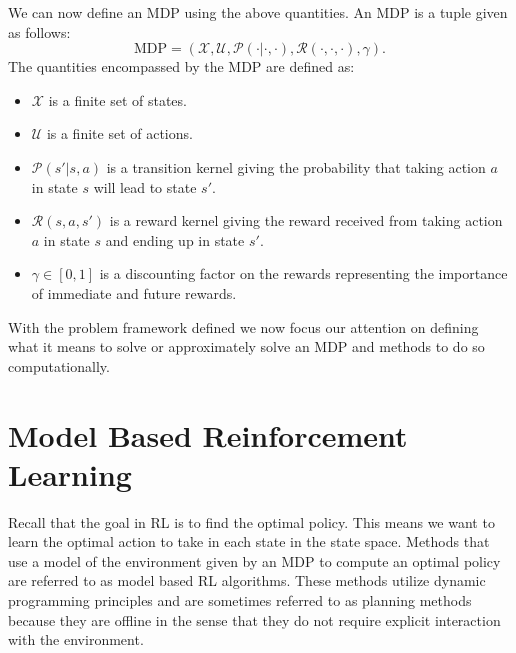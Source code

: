 \documentclass{article}
\newcommand{\mc}{\mathcal}
\begin{document}
We can now define an MDP using the above quantities. An MDP is a tuple given as follows:
\begin{equation}
\text{MDP} = (\mc{X}, \mc{U}, \mc{P}(\cdot|\cdot, \cdot), \mc{R}(\cdot, \cdot, \cdot), \gamma).
\end{equation}
The quantities encompassed by the MDP are defined as:
\begin{itemize}
\item $\mc{X}$ is a finite set of states.
\item $\mc{U}$ is a finite set of actions.
\item $\mc{P}(s'|s, a)$ is a transition kernel giving the probability that taking action $a$ in state $s$ will lead to state $s'$.
\item $\mc{R}(s, a, s')$ is a reward kernel giving the reward received from taking action $a$ in state $s$ and ending up in state $s'$.
\item $\gamma \in [0, 1]$ is a discounting factor on the rewards representing the importance of immediate and future rewards.
\end{itemize}
With the problem framework defined we now focus our attention on defining what it means to solve or approximately solve an MDP and methods to do so computationally.

\section{Model Based Reinforcement Learning}\label{sec:model_based}
Recall that the goal in RL is to find the optimal policy. This means we want to learn the optimal action to take in each state in the state space. Methods that use a model of the environment given by an MDP to compute an optimal policy are referred to as model based RL algorithms. These methods utilize dynamic programming principles and are sometimes referred to as planning methods because they are offline in the sense that they do not require explicit interaction with the environment.
\end{document}
